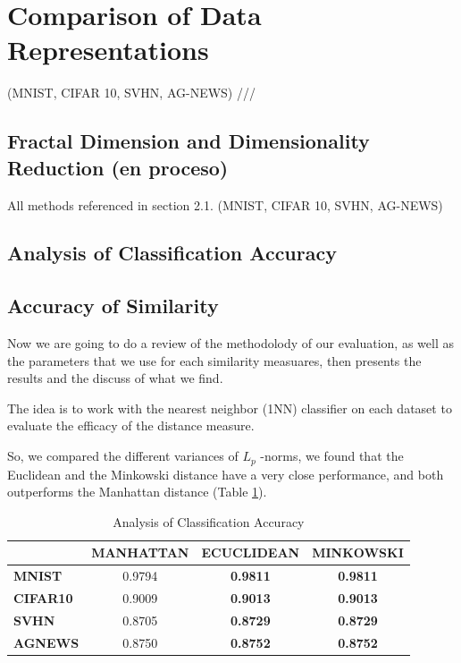 \documentclass{article}
\begin{document}
\section{Comparison of Data Representations} %
   
      (MNIST, CIFAR 10, SVHN, AG-NEWS) ///
   \subsection{Fractal Dimension and Dimensionality Reduction (en proceso)}
      	All methods referenced in section 2.1. (MNIST, CIFAR 10, SVHN, AG-NEWS)
   \subsection{Analysis of Classification Accuracy}
 


\subsection{Accuracy of Similarity} %


Now we are going to do a review of the methodolody of our evaluation, as well as the parameters that we use for each similarity measuares, then presents the results and the discuss of what we find.
      
The idea is to work with the nearest neighbor (1NN) classifier on each dataset to evaluate the efficacy of the distance measure.

So, we compared the different variances of $L_p$ -norms, we found that the Euclidean and the Minkowski distance have a very close performance, and both outperforms the Manhattan distance (Table \ref{accuracy-similatities}). 

\begin{table}[!h]
\centering
\caption{Analysis of Classification Accuracy}
\label{accuracy-similatities}
\begin{tabular}{|l|c|c|c|}
\hline
\textbf{}        & \textbf{MANHATTAN} & \textbf{ECUCLIDEAN} & \textbf{MINKOWSKI} \\ \hline
\textbf{MNIST}   & 0.9794             & \textbf{0.9811}     & \textbf{0.9811}    \\ \hline
\textbf{CIFAR10} & 0.9009             & \textbf{0.9013}     & \textbf{0.9013}    \\ \hline
\textbf{SVHN}    & 0.8705             & \textbf{0.8729}     & \textbf{0.8729}    \\ \hline
\textbf{AGNEWS}  & 0.8750             & \textbf{0.8752}     & \textbf{0.8752}    \\ \hline
\end{tabular}
\end{table}
\end{document}
